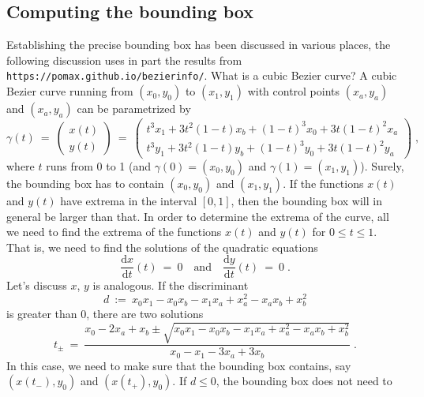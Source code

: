 \documentclass{article}
\begin{document}
\clearpage
\subsection*{Computing the bounding box}

Establishing the precise bounding box has been discussed in various places, the
following discussion uses in part the results from
\texttt{https://pomax.github.io/bezierinfo/}. What is a cubic Bezier curve? A
cubic Bezier curve running from $(x_0,y_0)$ to $(x_1,y_1)$ with control points
$(x_a,y_a)$ and $(x_a,y_a)$ can be parametrized by
\begin{equation}
 \gamma(t)~=~
 \begin{pmatrix} x(t)\\ y(t) \end{pmatrix}~=~
 \begin{pmatrix}t^3 x_{1}+3 t^2 (1-t) x_{b}+(1-t)^3
   x_{0}+3 t (1-t)^2 x_{a}\\
   t^3 y_{1}+3
   t^2 (1-t) y_{b}+(1-t)^3 y_{0}+3 t (1-t)^2
   y_{a}\end{pmatrix}\;,\label{eq:gammaBezier}
\end{equation}
where $t$ runs from 0 to 1 (and $\gamma(0)=(x_0,y_0)$ and
$\gamma(1)=(x_1,y_1)$). Surely, the bounding box has to contain
$(x_0,y_0)$ and $(x_1,y_1)$. If the functions $x(t)$ and $y(t)$ have extrema in
the interval $[0,1]$, then the bounding box will in general be larger than that.
In order to determine the extrema of the curve, all
we need to find the extrema of the functions $x(t)$ and $y(t)$ for $0\le t\le
1$. That is, we need to find the solutions of the quadratic equations
\begin{equation}
 \frac{\mathrm{d}x}{\mathrm{d}t}(t)~=~0\quad\text{and}\quad
 \frac{\mathrm{d}y}{\mathrm{d}t}(t)~=~0\;.
\end{equation}
Let's discuss $x$, $y$ is analogous. If the discriminant
\begin{equation}
 d~:=~x_{0} x_{1}-x_{0}
   x_{b}-x_{1}
   x_{a}+x_{a}^2-x_{a}
   x_{b}+x_{b}^2
\end{equation}
is greater than 0, there are two solutions
\begin{equation}
 t_\pm~=~\frac{x_{0}-2
   x_{a}+x_{b}\pm\sqrt{x_{0} x_{1}-x_{0}
   x_{b}-x_{1}
   x_{a}+x_{a}^2-x_{a}
   x_{b}+x_{b}^2}}{x_{0}-x_{1}-3
   x_{a}+3 x_{b}} \;.
\end{equation}   
In this case, we need to make sure that the bounding box contains, say
$(x(t_-),y_0)$ and $(x(t_+),y_0)$. If $d\le0$, the bounding box does not need to
\end{document}
